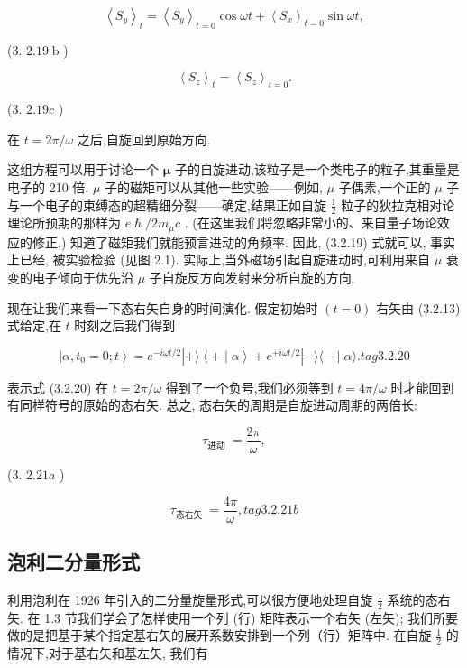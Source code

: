 $$
{\left\langle {S}_{y}\right\rangle }_{t} = {\left\langle {S}_{y}\right\rangle }_{t = 0}\cos {\omega t} + {\left\langle {S}_{x}\right\rangle }_{t = 0}\sin {\omega t},
$$

(3. ${2.19}\mathrm{\;b}$ )

$$
{\left\langle {S}_{z}\right\rangle }_{t} = {\left\langle {S}_{z}\right\rangle }_{t = 0}.
$$

(3. ${2.19c}$ )

在 $t = {2\pi }/\omega$ 之后,自旋回到原始方向.

这组方程可以用于讨论一个 $\mathbf{\mu }$ 子的自旋进动,该粒子是一个类电子的粒子,其重量是电子的 210 倍. $\mu$ 子的磁矩可以从其他一些实验——例如, $\mu$ 子偶素,一个正的 $\mu$ 子与一个电子的束缚态的超精细分裂——确定,结果正如自旋 $\frac{1}{2}$ 粒子的狄拉克相对论理论所预期的那样为 $e\hslash /2{m}_{\mu }c$ . (在这里我们将忽略非常小的、来自量子场论效应的修正.) 知道了磁矩我们就能预言进动的角频率. 因此, (3.2.19) 式就可以, 事实上已经, 被实验检验 (见图 2.1). 实际上,当外磁场引起自旋进动时,可利用来自 $\mu$ 衰变的电子倾向于优先沿 $\mu$ 子自旋反方向发射来分析自旋的方向.

现在让我们来看一下态右矢自身的时间演化. 假定初始时 $\left( {t = 0}\right)$ 右矢由 (3.2.13) 式给定,在 $t$ 时刻之后我们得到

$$
\left| {\alpha ,{t}_{0} = 0;t}\right\rangle = {e}^{-{i\omega t}/2}\left| {+\rangle \left\langle {+ \mid \alpha }\right\rangle + {e}^{+{i\omega t}/2}}\right| - \rangle \langle - \mid \alpha \rangle . tag{3.2.20}
$$

表示式 (3.2.20) 在 $t = {2\pi }/\omega$ 得到了一个负号,我们必须等到 $t = {4\pi }/\omega$ 时才能回到有同样符号的原始的态右矢. 总之, 态右矢的周期是自旋进动周期的两倍长:

$$
{\tau }_{\text{进动 }} = \frac{2\pi }{\omega },
$$

(3. ${2.21a}$ )

$$
{\tau }_{\text{态右矢 }} = \frac{4\pi }{\omega }, tag{3.2.21b}
$$

\subsection{泡利二分量形式} 

利用泡利在 1926 年引入的二分量旋量形式,可以很方便地处理自旋 $\frac{1}{2}$ 系统的态右矢. 在 1.3 节我们学会了怎样使用一个列 (行) 矩阵表示一个右矢 (左矢); 我们所要做的是把基于某个指定基右矢的展开系数安排到一个列（行）矩阵中. 在自旋 $\frac{1}{2}$ 的情况下,对于基右矢和基左矢, 我们有

